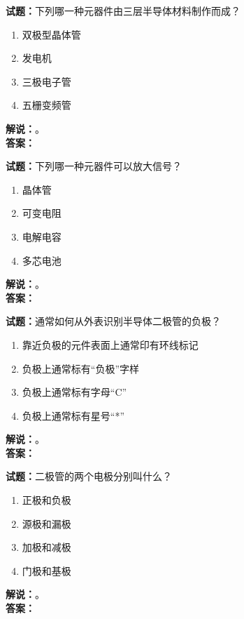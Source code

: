 \documentclass{ctexbook}
\begin{document}
\vspace{\baselineskip}

\noindent\textbf{试题：}下列哪一种元器件由三层半导体材料制作而成？
\begin{enumerate}[leftmargin=3em]
  \item 双极型晶体管
  \item 发电机
  \item 三极电子管
  \item 五栅变频管
\end{enumerate}
\noindent\textbf{解说：}\textbf{}。\\\noindent\textbf{答案：}

\vspace{\baselineskip}

\noindent\textbf{试题：}下列哪一种元器件可以放大信号？
\begin{enumerate}[leftmargin=3em]
  \item 晶体管
  \item 可变电阻
  \item 电解电容
  \item 多芯电池
\end{enumerate}
\noindent\textbf{解说：}\textbf{}。\\\noindent\textbf{答案：}

\vspace{\baselineskip}

\noindent\textbf{试题：}通常如何从外表识别半导体二极管的负极？
\begin{enumerate}[leftmargin=3em]
  \item 靠近负极的元件表面上通常印有环线标记
  \item 负极上通常标有“负极”字样
  \item 负极上通常标有字母“C”
  \item 负极上通常标有星号“*”
\end{enumerate}
\noindent\textbf{解说：}\textbf{}。\\\noindent\textbf{答案：}

\vspace{\baselineskip}

\noindent\textbf{试题：}二极管的两个电极分别叫什么？
\begin{enumerate}[leftmargin=3em]
  \item 正极和负极
  \item 源极和漏极
  \item 加极和减极
  \item 门极和基极
\end{enumerate}
\noindent\textbf{解说：}\textbf{}。\\\noindent\textbf{答案：}
\end{document}
